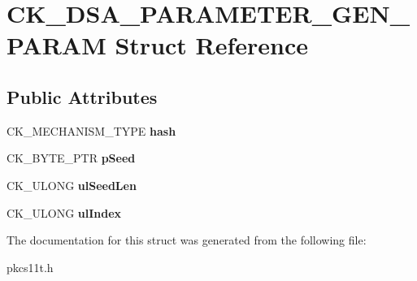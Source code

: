 \hypertarget{struct_c_k___d_s_a___p_a_r_a_m_e_t_e_r___g_e_n___p_a_r_a_m}{}\section{C\+K\+\_\+\+D\+S\+A\+\_\+\+P\+A\+R\+A\+M\+E\+T\+E\+R\+\_\+\+G\+E\+N\+\_\+\+P\+A\+R\+AM Struct Reference}
\label{struct_c_k___d_s_a___p_a_r_a_m_e_t_e_r___g_e_n___p_a_r_a_m}
\subsection*{Public Attributes}
\begin{DoxyCompactItemize}
\item 
\mbox{\label{struct_c_k___d_s_a___p_a_r_a_m_e_t_e_r___g_e_n___p_a_r_a_m_afe6ab7148f543c481849e0ec34a5640d}} 
C\+K\+\_\+\+M\+E\+C\+H\+A\+N\+I\+S\+M\+\_\+\+T\+Y\+PE {\bfseries hash}
\item 
\mbox{\label{struct_c_k___d_s_a___p_a_r_a_m_e_t_e_r___g_e_n___p_a_r_a_m_a0b2bc38c8356e579a5aa6100cf3e81df}} 
C\+K\+\_\+\+B\+Y\+T\+E\+\_\+\+P\+TR {\bfseries p\+Seed}
\item 
\mbox{\label{struct_c_k___d_s_a___p_a_r_a_m_e_t_e_r___g_e_n___p_a_r_a_m_a101fd84998c7372253c82bb5c86441c4}} 
C\+K\+\_\+\+U\+L\+O\+NG {\bfseries ul\+Seed\+Len}
\item 
\mbox{\label{struct_c_k___d_s_a___p_a_r_a_m_e_t_e_r___g_e_n___p_a_r_a_m_af9a4d7597af2e0c9ec658123ccfdab3f}} 
C\+K\+\_\+\+U\+L\+O\+NG {\bfseries ul\+Index}
\end{DoxyCompactItemize}


The documentation for this struct was generated from the following file\+:\begin{DoxyCompactItemize}
\item 
pkcs11t.\+h\end{DoxyCompactItemize}
